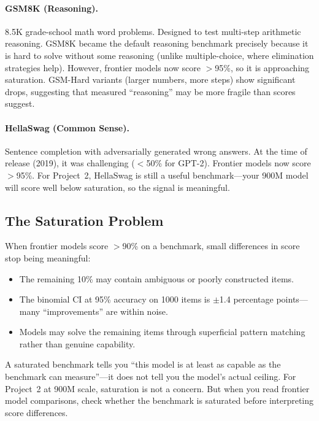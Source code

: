 \paragraph{GSM8K (Reasoning).} 8.5K grade-school math word problems. Designed to test multi-step arithmetic reasoning. GSM8K became the default reasoning benchmark precisely because it is hard to solve without some reasoning (unlike multiple-choice, where elimination strategies help). However, frontier models now score $>$95\%, so it is approaching saturation. GSM-Hard variants (larger numbers, more steps) show significant drops, suggesting that measured ``reasoning'' may be more fragile than scores suggest.

\paragraph{HellaSwag (Common Sense).} Sentence completion with adversarially generated wrong answers. At the time of release (2019), it was challenging ($<$50\% for GPT-2). Frontier models now score $>$95\%. For Project~2, HellaSwag is still a useful benchmark---your 900M model will score well below saturation, so the signal is meaningful.

\subsection{The Saturation Problem}

When frontier models score $>$90\% on a benchmark, small differences in score stop being meaningful:
\begin{itemize}[nosep]
  \item The remaining 10\% may contain ambiguous or poorly constructed items.
  \item The binomial CI at 95\% accuracy on 1000 items is $\pm$1.4 percentage points---many ``improvements'' are within noise.
  \item Models may solve the remaining items through superficial pattern matching rather than genuine capability.
\end{itemize}

A saturated benchmark tells you ``this model is at least as capable as the benchmark can measure''---it does not tell you the model's actual ceiling. For Project~2 at 900M scale, saturation is not a concern. But when you read frontier model comparisons, check whether the benchmark is saturated before interpreting score differences.

